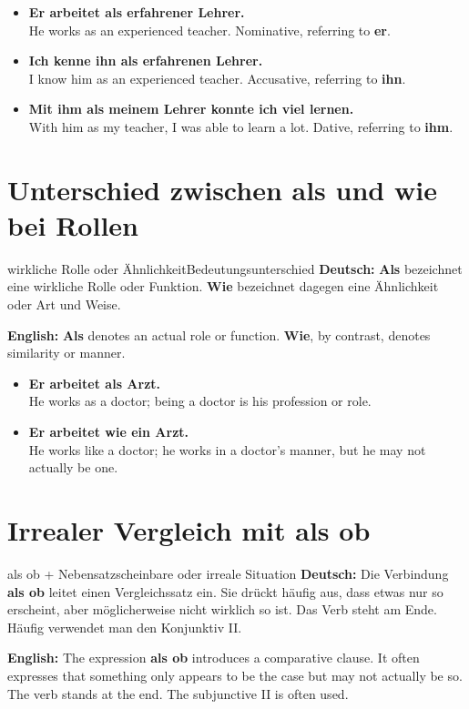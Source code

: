 \documentclass[a4paper,11pt]{article}
\newcommand{\GermanText}[1]{\textbf{Deutsch: }#1\par}
\newcommand{\EnglishText}[1]{{\small\color{SoftGray}\textbf{English: }#1\par}}
\newcommand{\ExampleItem}[2]{\item \textbf{#1}\\{\small\color{SoftGray}#2}}
\begin{document}
        \begin{exbox}
            \begin{itemize}
                \ExampleItem{Er arbeitet als erfahrener Lehrer.}{He works as an experienced teacher. Nominative, referring to \textbf{er}.}
                \ExampleItem{Ich kenne ihn als erfahrenen Lehrer.}{I know him as an experienced teacher. Accusative, referring to \textbf{ihn}.}
                \ExampleItem{Mit ihm als meinem Lehrer konnte ich viel lernen.}{With him as my teacher, I was able to learn a lot. Dative, referring to \textbf{ihm}.}
            \end{itemize}
        \end{exbox}

    \section{Unterschied zwischen \glqq als\grqq{} und \glqq wie\grqq{} bei Rollen}

        \begin{grammarentry}{wirkliche Rolle oder Ähnlichkeit}{Bedeutungsunterschied}
            \GermanText{\textbf{Als} bezeichnet eine wirkliche Rolle oder Funktion. \textbf{Wie} bezeichnet dagegen eine Ähnlichkeit oder Art und Weise.}
            \EnglishText{\textbf{Als} denotes an actual role or function. \textbf{Wie}, by contrast, denotes similarity or manner.}
        \end{grammarentry}

        \begin{exbox}
            \begin{itemize}
                \ExampleItem{Er arbeitet als Arzt.}{He works as a doctor; being a doctor is his profession or role.}
                \ExampleItem{Er arbeitet wie ein Arzt.}{He works like a doctor; he works in a doctor's manner, but he may not actually be one.}
            \end{itemize}
        \end{exbox}

    \section{Irrealer Vergleich mit \glqq als ob\grqq}

        \begin{grammarentry}{als ob + Nebensatz}{scheinbare oder irreale Situation}
            \GermanText{Die Verbindung \textbf{als ob} leitet einen Vergleichssatz ein. Sie drückt häufig aus, dass etwas nur so erscheint, aber möglicherweise nicht wirklich so ist. Das Verb steht am Ende. Häufig verwendet man den Konjunktiv II.}
            \EnglishText{The expression \textbf{als ob} introduces a comparative clause. It often expresses that something only appears to be the case but may not actually be so. The verb stands at the end. The subjunctive II is often used.}
        \end{grammarentry}
\end{document}
